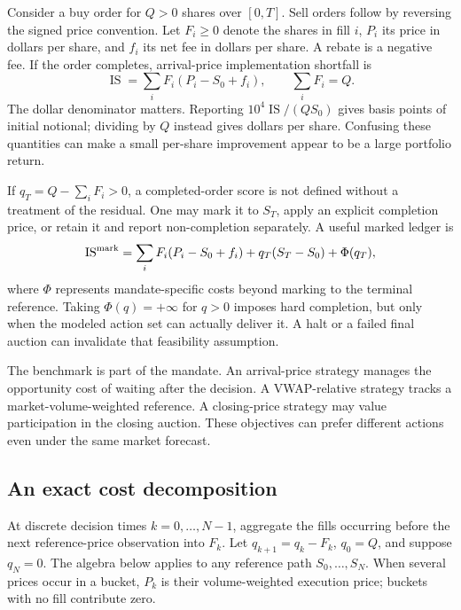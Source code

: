 \documentclass[11pt]{article}
\numberwithin{equation}{section}
\theoremstyle{definition}
\theoremstyle{remark}
\theoremstyle{definition}
\begin{document}
Consider a buy order for $Q>0$ shares over $[0,T]$. Sell orders follow by reversing
the signed price convention. Let $F_i\geq0$ denote the shares in fill $i$, $P_i$
its price in dollars per share, and $f_i$ its net fee in dollars per share.
A rebate is a negative fee. If the order completes, arrival-price implementation
shortfall is
\begin{equation}\label{eq:is}
 \operatorname{IS}=\sum_i F_i(P_i-S_0+f_i),\qquad \sum_iF_i=Q.
\end{equation}
The dollar denominator matters. Reporting $10^4\operatorname{IS}/(QS_0)$ gives
basis points of initial notional; dividing by $Q$ instead gives dollars per share.
Confusing these quantities can make a small per-share improvement appear to be
a large portfolio return.

If $q_T=Q-\sum_iF_i>0$, a completed-order score is not defined without a treatment
of the residual. One may mark it to $S_T$, apply an explicit completion price,
or retain it and report non-completion separately. A useful marked ledger is
\begin{equation}\label{eq:residual}
 \operatorname{IS}^{\rm mark}
 =\sum_i F_i(P_i-S_0+f_i)+q_T(S_T-S_0)+\Phi(q_T),
\end{equation}
where $\Phi$ represents mandate-specific costs beyond marking to the terminal
reference. Taking $\Phi(q)=+\infty$ for $q>0$ imposes hard completion, but only
when the modeled action set can actually deliver it. A halt or a failed final
auction can invalidate that feasibility assumption.

The benchmark is part of the mandate. An arrival-price strategy manages the
opportunity cost of waiting after the decision. A VWAP-relative strategy tracks
a market-volume-weighted reference. A closing-price strategy may value
participation in the closing auction. These objectives can prefer different
actions even under the same market forecast.

\subsection{An exact cost decomposition}

At discrete decision times $k=0,\ldots,N-1$, aggregate the fills occurring before
the next reference-price observation into $F_k$. Let
$q_{k+1}=q_k-F_k$, $q_0=Q$, and suppose $q_N=0$. The algebra below applies to any
reference path $S_0,\ldots,S_N$. When several prices occur in a bucket, $P_k$
is their volume-weighted execution price; buckets with no fill contribute zero.
\end{document}
